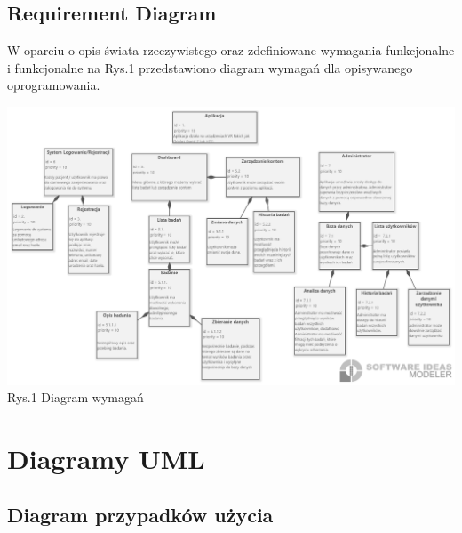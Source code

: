 \documentclass[12pt, letterpaper]{article}
\begin{document}
			
		\subsection{Requirement Diagram}
		
		W oparciu o opis świata rzeczywistego oraz zdefiniowane wymagania funkcjonalne i funkcjonalne na Rys.1 przedstawiono diagram wymagań dla opisywanego oprogramowania.
		
		\begin{center}
			\includegraphics[scale=0.4]{reqDiagram}\\
			\caption{Rys.1 Diagram wymagań}
		\end{center}
		
		
		\section{Diagramy UML}
		\subsection{Diagram przypadków użycia}
		
\end{document}
